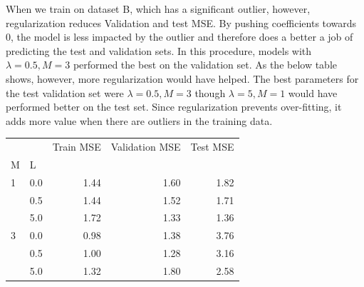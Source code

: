 \documentclass[10pt]{article}
\begin{document}
When we train on dataset B, which has a significant outlier, however, regularization reduces Validation and test MSE. By pushing coefficients towards 0, the model is less impacted by the outlier and therefore does a better a job of predicting the test and validation sets. In this procedure, models with  $\lambda = 0.5, M=3$ performed the best on the validation set. As the below table shows, however, more regularization would have helped. The best parameters for the test validation set  were  $\lambda = 0.5, M=3$  though $\lambda = 5, M=1$ would have performed better on the test set.  Since regularization prevents over-fitting, it adds more value when there are outliers in the training data. 


\begin{tabular}{llrrr}

  &     &  Train MSE &  Validation MSE &  Test MSE \\
M & L &            &                 &           \\

1 & 0.0 &       1.44 &            1.60 &      1.82 \\
  & 0.5 &       1.44 &            1.52 &      1.71 \\
  & 5.0 &       1.72 &            1.33 &      1.36 \\
3 & 0.0 &       0.98 &            1.38 &      3.76 \\
  & 0.5 &       1.00 &            1.28 &      3.16 \\
  & 5.0 &       1.32 &            1.80 &      2.58 \\

\end{tabular}
\end{document}

